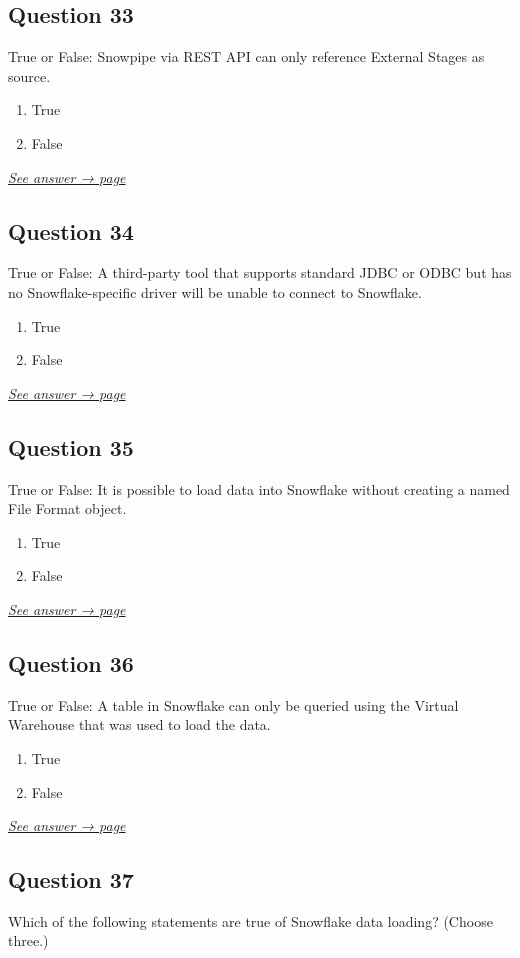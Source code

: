 \documentclass[12pt]{article}
\newcommand{\seeanswer}[1]{%
  \par\smallskip\emph{\hyperref[ans:#1]{See answer → page \pageref{ans:#1}}}%
}
\begin{document}
\subsection*{Question 33}\label{q:33}
True or False: Snowpipe via REST API can only reference External Stages as source.

\begin{enumerate}[label=\Alph*.]
  \item True
  \item False
\end{enumerate}
\seeanswer{33}

\subsection*{Question 34}\label{q:34}
True or False: A third-party tool that supports standard JDBC or ODBC but has no Snowflake-specific driver will be unable to connect to Snowflake.

\begin{enumerate}[label=\Alph*.]
  \item True
  \item False
\end{enumerate}
\seeanswer{34}

\subsection*{Question 35}\label{q:35}
True or False: It is possible to load data into Snowflake without creating a named File Format object.

\begin{enumerate}[label=\Alph*.]
  \item True
  \item False
\end{enumerate}
\seeanswer{35}

\subsection*{Question 36}\label{q:36}
True or False: A table in Snowflake can only be queried using the Virtual Warehouse that was used to load the data.

\begin{enumerate}[label=\Alph*.]
  \item True
  \item False
\end{enumerate}
\seeanswer{36}

\subsection*{Question 37}\label{q:37}
Which of the following statements are true of Snowflake data loading? (Choose three.)
\end{document}
